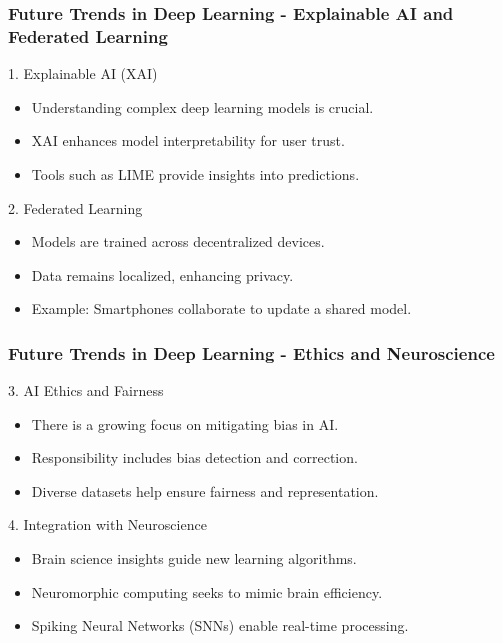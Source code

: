 \documentclass[aspectratio=169]{beamer}
\begin{document}
\begin{frame}[fragile]
    \frametitle{Future Trends in Deep Learning - Explainable AI and Federated Learning}
    \begin{block}{1. Explainable AI (XAI)}
        \begin{itemize}
            \item Understanding complex deep learning models is crucial.
            \item XAI enhances model interpretability for user trust.
            \item Tools such as LIME provide insights into predictions.
        \end{itemize}
    \end{block}

    \begin{block}{2. Federated Learning}
        \begin{itemize}
            \item Models are trained across decentralized devices.
            \item Data remains localized, enhancing privacy.
            \item Example: Smartphones collaborate to update a shared model.
        \end{itemize}
    \end{block}
\end{frame}

\begin{frame}[fragile]
    \frametitle{Future Trends in Deep Learning - Ethics and Neuroscience}
    \begin{block}{3. AI Ethics and Fairness}
        \begin{itemize}
            \item There is a growing focus on mitigating bias in AI.
            \item Responsibility includes bias detection and correction.
            \item Diverse datasets help ensure fairness and representation.
        \end{itemize}
    \end{block}

    \begin{block}{4. Integration with Neuroscience}
        \begin{itemize}
            \item Brain science insights guide new learning algorithms.
            \item Neuromorphic computing seeks to mimic brain efficiency.
            \item Spiking Neural Networks (SNNs) enable real-time processing.
        \end{itemize}
    \end{block}
\end{frame}
\end{document}
